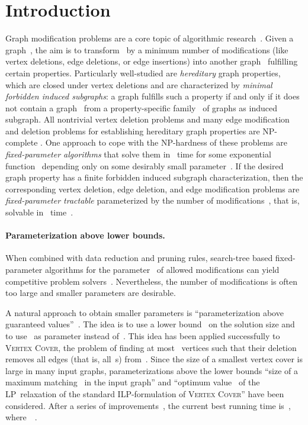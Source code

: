 \documentclass[envcountsame,numbook,smallextended]{svjour3}
\numberwithin{equation}{section}
\numberwithin{figure}{section}
\begin{document}
\section{Introduction}
Graph modification problems are a core topic
of algorithmic research~\cite{LY80,Cai96,Yan81}.
Given a graph~,
the aim is to transform~ by a minimum number of modifications
(like vertex deletions, edge deletions, or edge insertions)
into another graph~ fulfilling certain properties.
Particularly well-studied are \emph{hereditary} graph properties, which are closed under vertex deletions and are characterized by \emph{minimal forbidden induced subgraphs}: a graph fulfills such a property if and only if it does not contain a graph~ from a property-specific family~ of graphs as induced subgraph.  All nontrivial vertex deletion problems and many edge modification and deletion problems for establishing hereditary graph properties are NP-complete
\cite{LY80,Alon06,MK86,Yan81,ASS16}.  One approach to cope with the NP-hardness of these problems are \emph{fixed-parameter algorithms} that solve them in ~time for some exponential function~ depending only on some desirably small parameter~.   If the desired graph property has a finite forbidden induced subgraph characterization, then the corresponding vertex deletion, edge deletion, and edge modification problems are \emph{fixed-parameter tractable} parameterized by the number of modifications~, that is, solvable in ~time~\cite{Cai96}.

\paragraph{Parameterization above lower bounds.} When combined with data reduction and pruning rules, search-tree based fixed-parameter algorithms for the parameter~ of allowed modifications can yield competitive problem solvers~\cite{HH15,MNS12}.  Nevertheless, the number of modifications is often too large and smaller parameters are desirable.

A natural approach to obtain smaller parameters is ``parameterization above guaranteed values''~\cite{MR99,CPPW13,LNR+14,GP15}. The idea is to use a lower bound~ on the solution size and to use~ as parameter instead of~.
This idea has been applied successfully to \textsc{Vertex Cover}, the
problem of finding at most ~vertices such that
their deletion removes all edges (that is, all~s) from~. Since the size of a smallest vertex
cover is large in many input graphs, 
parameterizations above
the lower bounds ``size of a maximum
matching~ in the input graph'' and ``optimum value~ of the LP~relaxation of the standard ILP-formulation of \textsc{Vertex Cover}''
have been considered.
After a series of
improvements~\cite{RO09,CPPW13,LNR+14,GP15}, the current best running time
is~, where~~\cite{GP15}.
\end{document}
